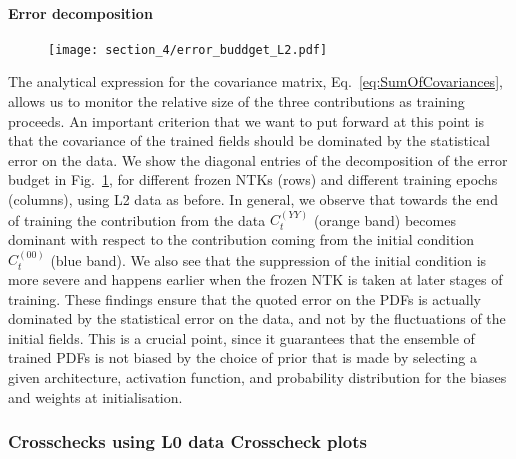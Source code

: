 \paragraph{Error decomposition}
\begin{figure}[t!]
  \centering
  \texttt{[image: section\_4/error\_buddget\_L2.pdf]}
  \caption{}
  \label{fig:ErrorBudgetL2}
\end{figure}
The analytical expression for the covariance matrix,
Eq.~\eqref{eq:SumOfCovariances}, allows us to monitor the relative size of the
three contributions as training proceeds. An important criterion that we want to
put forward at this point is that the covariance of the trained fields should be
dominated by the statistical error on the data. We show the diagonal entries of
the decomposition of the error budget in Fig.~\ref{fig:ErrorBudgetL2}, for
different frozen NTKs (rows) and different training epochs (columns), using L2
data as before. In general, we observe that towards the end of training the
contribution from the data $C_t^{(YY)}$ (orange band) becomes dominant with
respect to the contribution coming from the initial condition $C_t^{(00)}$ (blue
band). We also see that the suppression of the initial condition is more severe
and happens earlier when the frozen NTK is taken at later stages of training.
These findings ensure that the quoted error on the PDFs is actually dominated by
the statistical error on the data, and not by the fluctuations of the initial
fields. This is a crucial point, since it guarantees that the ensemble of
trained PDFs is not biased by the choice of prior that is made by selecting a
given architecture, activation function, and probability distribution for the
biases and weights at initialisation.

\subsubsection{Crosschecks using L0 data \ac{Crosscheck plots}}
\label{sec:AnalyticalChecks}

